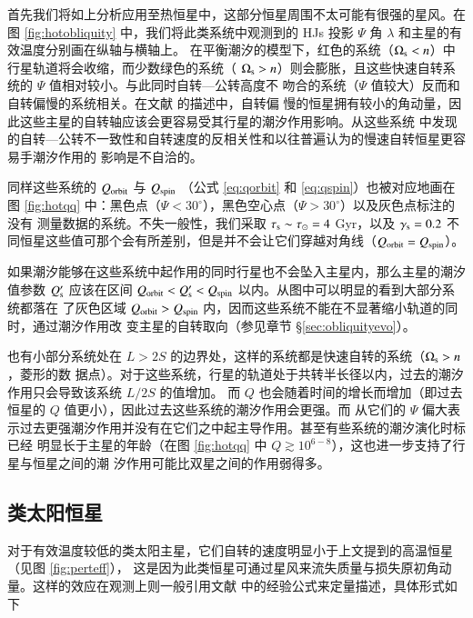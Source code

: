首先我们将如上分析应用至热恒星中，这部分恒星周围不太可能有很强的星风。在图 \ref{fig:hotobliquity} 
中，我们将此类系统中观测到的 HJs 投影 $\Psi$ 角 $\lambda$ 和主星的有效温度分别画在纵轴与横轴上。
在平衡潮汐的模型下，红色的系统（$\Omega_\mathrm{s} < n$）中行星轨道将会收缩，而少数绿色的系统（
$\Omega_\mathrm{s} > n$）则会膨胀，且这些快速自转系统的 $\Psi$ 值相对较小。与此同时自转---公转高度不
吻合的系统（$\Psi$ 值较大）反而和自转偏慢的系统相关。在文献  的描述中，自转偏
慢的恒星拥有较小的角动量，因此这些主星的自转轴应该会更容易受其行星的潮汐作用影响。从这些系统
中发现的自转---公转不一致性和自转速度的反相关性和以往普遍认为的慢速自转恒星更容易手潮汐作用的
影响是不自洽的\cite{Rogers2013,Li2016}。

同样这些系统的  $Q_\mathrm{orbit}$ 与 $Q_\mathrm{spin}$ （公式 \ref{eq:qorbit} 和 \ref{eq:qspin}）也被对应地画在
图 \ref{fig:hotqq} 中：黑色点（$\Psi < 30^\circ$），黑色空心点（$\Psi > 30^\circ$）以及灰色点标注的没有
测量数据的系统。不失一般性，我们采取 $\tau_\mathrm{s} \sim \tau_\odot = 4 $ Gyr，以及 $\gamma_\mathrm{s} = 0.2$
不同恒星这些值可那个会有所差别，但是并不会让它们穿越对角线（$Q_\mathrm{orbit} = Q_\mathrm{spin}$）。

如果潮汐能够在这些系统中起作用的同时行星也不会坠入主星内，那么主星的潮汐值参数 $Q_\mathrm{s}^\prime$
应该在区间 $Q_\mathrm{orbit} < Q_\mathrm{s}^\prime <  Q_\mathrm{spin}$ 以内。从图中可以明显的看到大部分系统都落在
了灰色区域 $Q_\mathrm{orbit} >  Q_\mathrm{spin}$ 内，因而这些系统不能在不显著缩小轨道的同时，通过潮汐作用改
变主星的自转取向（参见章节 \S \ref{sec:obliquityevo}）。

也有小部分系统处在 $L> 2S$ 的边界处，这样的系统都是快速自转的系统（$\Omega_\mathrm{s} > n$，菱形的数
据点）。对于这些系统，行星的轨道处于共转半长径以内，过去的潮汐作用只会导致该系统 $L/2S$ 的值增加。
而 $Q$ 也会随着时间的增长而增加（即过去恒星的 $Q$ 值更小），因此过去这些系统的潮汐作用会更强。而
从它们的 $\Psi$ 偏大表示过去更强潮汐作用并没有在它们之中起主导作用。甚至有些系统的潮汐演化时标已经
明显长于主星的年龄（在图 \ref{fig:hotqq} 中 $Q \gtrsim 10^{6-8}$），这也进一步支持了行星与恒星之间的潮
汐作用可能比双星之间的作用弱得多\cite{Ogilvie2007}。


\subsection{类太阳恒星} \label{sec:coolstar}

对于有效温度较低的类太阳主星，它们自转的速度明显小于上文提到的高温恒星（见图 \ref{fig:perteff}），
这是因为此类恒星可通过星风来流失质量与损失原初角动量。这样的效应在观测上则一般引用文献
 中的经验公式来定量描述，具体形式如下

